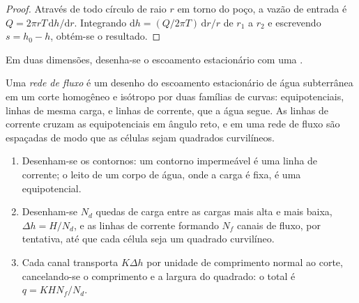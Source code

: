 \begin{proof}
Através de todo círculo de raio $r$ em torno do poço, a vazão de entrada é $Q = 2\pi r
T\,\mathrm dh/\mathrm dr$. Integrando $\mathrm dh = (Q/2\pi T)\,\mathrm
dr/r$ de $r_1$ a $r_2$ e escrevendo $s = h_0 - h$, obtém-se o resultado.
\end{proof}

Em duas dimensões, desenha-se o escoamento estacionário com uma .

\begin{definition}\label{def:b3:hydrogeology:flow-net}
Uma \emph{rede de fluxo} é um desenho do escoamento estacionário de água subterrânea em
um corte homogêneo e isótropo por duas famílias de curvas: equipotenciais,
linhas de mesma carga, e linhas de corrente, que a água segue. As
linhas de corrente cruzam as equipotenciais em ângulo reto, e em uma rede de fluxo
são espaçadas de modo que as células sejam quadrados curvilíneos.
\end{definition}

\begin{method}\label{met:b3:hydrogeology:flow-net}
\leavevmode
\begin{enumerate}
\item Desenham-se os contornos: um contorno impermeável é uma linha de corrente; o leito de um
  corpo de água, onde a carga é fixa, é uma equipotencial.
\item Desenham-se $N_d$ quedas de carga entre as cargas mais alta e mais baixa, $\Delta h
  = H/N_d$, e as linhas de corrente formando $N_f$ canais de fluxo, por tentativa,
  até que cada célula seja um quadrado curvilíneo.
\item Cada canal transporta $K\Delta h$ por unidade de comprimento normal ao
  corte, cancelando-se o comprimento e a largura do quadrado: o total é $q =
  KHN_f/N_d$.
\end{enumerate}
\end{method}

